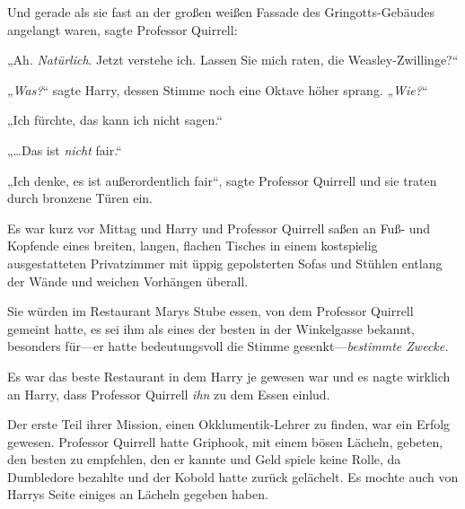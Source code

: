 Und gerade als sie fast an der großen weißen Fassade des Gringotts-Gebäudes angelangt waren, sagte Professor Quirrell:

„Ah. \emph{Natürlich}. Jetzt verstehe ich. Lassen Sie mich raten, die Weasley-Zwillinge?“

„\emph{Was?}“ sagte Harry, dessen Stimme noch eine Oktave höher sprang. „\emph{Wie?}“

„Ich fürchte, das kann ich nicht sagen.“

„…Das ist \emph{nicht} fair.“

„Ich denke, es ist außerordentlich fair“, sagte Professor Quirrell und sie traten durch bronzene Türen ein.

\later

Es war kurz vor Mittag und Harry und Professor Quirrell saßen an Fuß- und Kopfende eines breiten, langen, flachen Tisches in einem kostspielig ausgestatteten Privatzimmer mit üppig gepolsterten Sofas und Stühlen entlang der Wände und weichen Vorhängen überall.

Sie würden im Restaurant Marys Stube essen, von dem Professor Quirrell gemeint hatte, es sei ihm als eines der besten in der Winkelgasse bekannt, besonders für—er hatte bedeutungsvoll die Stimme gesenkt—\emph{bestimmte Zwecke.}

Es war das beste Restaurant in dem Harry je gewesen war und es nagte wirklich an Harry, dass Professor Quirrell \emph{ihn} zu dem Essen einlud.

Der erste Teil ihrer Mission, einen Okklumentik-Lehrer zu finden, war ein Erfolg gewesen. Professor Quirrell hatte Griphook, mit einem bösen Lächeln, gebeten, den besten zu empfehlen, den er kannte und Geld spiele keine Rolle, da Dumbledore bezahlte und der Kobold hatte zurück gelächelt. Es mochte auch von Harrys Seite einiges an Lächeln gegeben haben.

